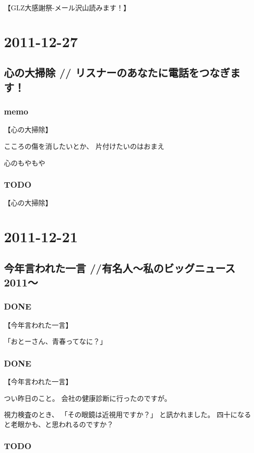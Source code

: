\documentclass[11pt]{article}
\begin{document}
【GLZ大感謝祭-メール沢山読みます！】
\section{2011-12-27}
\label{sec-16}
\subsection{心の大掃除 // リスナーのあなたに電話をつなぎます！}
\label{sec-16_1}
\subsubsection{memo}
\label{sec-16_1_1}

【心の大掃除】

こころの傷を消したいとか、
片付けたいのはおまえ

心のもやもや
\subsubsection{\textbf{TODO}}
\label{sec-16_1_2}

【心の大掃除】
\section{2011-12-21}
\label{sec-17}
\subsection{今年言われた一言 //有名人～私のビッグニュース2011～}
\label{sec-17_1}
\subsubsection{\textbf{DONE}}
\label{sec-17_1_1}

【今年言われた一言】

「おとーさん、青春ってなに？」
\subsubsection{\textbf{DONE}}
\label{sec-17_1_2}

【今年言われた一言】

つい昨日のこと。
会社の健康診断に行ったのですが。

視力検査のとき、
「その眼鏡は近視用ですか？」
と訊かれました。
四十になると老眼かも、と思われるのですか？
\subsubsection{\textbf{TODO}}
\label{sec-17_1_3}
\end{document}
